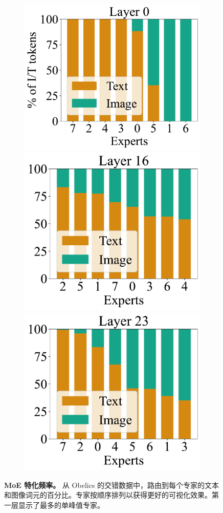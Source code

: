 

\begin{figure}[t!]
    \centering
    \captionsetup{type=figure}
    \begin{subfigure}[h]{0.95\linewidth}
    \includegraphics[height=0.27\textwidth]{assets/moes/specialization/sorted/tokens_assignment_obelics_1088_150_0.pdf}
    \includegraphics[height=0.27\textwidth]{assets/moes/specialization/sorted/tokens_assignment_obelics_1088_150_16.pdf}
    \includegraphics[height=0.27\textwidth]{assets/moes/specialization/sorted/tokens_assignment_obelics_1088_150_23.pdf}
    \end{subfigure}    \caption{\textbf{MoE 特化频率。} 从 Obelics 的交错数据中，路由到每个专家的文本和图像词元的百分比。专家按顺序排列以获得更好的可视化效果。第一层显示了最多的单峰值专家。}
    \label{fig:tokens_assignment}
\end{figure}
